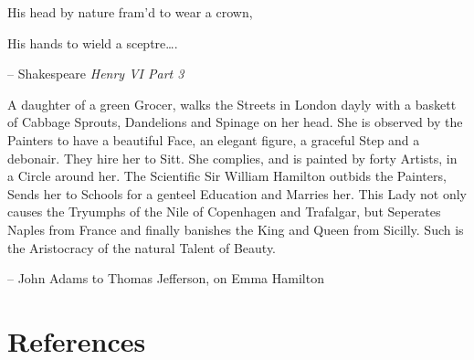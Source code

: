 \documentclass[
  12pt,
]{article}
\theoremstyle{definition}
\theoremstyle{definition}
\theoremstyle{definition}
\theoremstyle{definition}
\theoremstyle{remark}
\begin{document}
His head by nature fram'd to wear a crown,

His hands to wield a sceptre\ldots.

-- Shakespeare \emph{Henry VI Part 3}

A daughter of a green Grocer, walks the Streets in London dayly with a
baskett of Cabbage Sprouts, Dandelions and Spinage on her head. She is
observed by the Painters to have a beautiful Face, an elegant figure, a
graceful Step and a debonair. They hire her to Sitt. She complies, and
is painted by forty Artists, in a Circle around her. The Scientific Sir
William Hamilton outbids the Painters, Sends her to Schools for a
genteel Education and Marries her. This Lady not only causes the
Tryumphs of the Nile of Copenhagen and Trafalgar, but Seperates Naples
from France and finally banishes the King and Queen from Sicilly. Such
is the Aristocracy of the natural Talent of Beauty.

-- John Adams to Thomas Jefferson, on Emma Hamilton

\newpage

\section*{References}\label{references}
\end{document}
